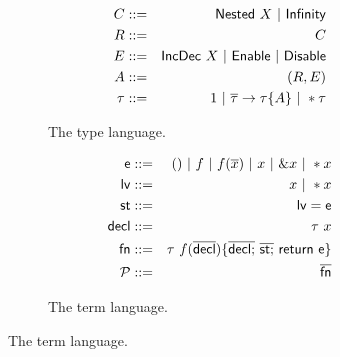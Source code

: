 \documentclass{article}
\begin{document}
\begin{figure}[h]
	\begin{subfigure}[b]{0.5\textwidth}
	\begin{eqnarray*}
		C & ::= & {\sf Nested}~ X ~|~ {{\sf Infinity}} \\
		R & ::= & C \\
		E & ::= & {\sf IncDec}~ X ~|~ {{\sf Enable}} ~|~ {{\sf Disable}} \\
		A & ::= & (R,E) \\
		\tau & ::= & {1} ~|~ \overline{\tau} \rightarrow \tau \{A\} ~|~ *\tau \\
	\end{eqnarray*}
	\caption{The type language.}
	\end{subfigure}
	\begin{subfigure}[b]{0.5\textwidth}
	\begin{eqnarray*}
		\mathsf{e} & ::= & () ~|~ f ~|~ f(\overline{x}) ~|~ x ~|~ \& x ~|~ *x \\
		\mathsf{lv}   & ::= & x ~|~ *x \\
		\mathsf{st} & ::= & \mathsf{lv} = \mathsf{e} \\
		\mathsf{decl} & ::= & \tau~x \\
		\mathsf{fn}   & ::= & \tau~f(\overline{\mathsf{decl}}) \{ \overline{\mathsf{decl};}~\overline{\mathsf{st};}~\mathsf{return}~\mathsf{e} \} \\
		\mathcal{P} & ::= & \overline{\mathsf{fn}}
	\end{eqnarray*}
	\caption{The term language.}
	\end{subfigure}
\end{figure}
\end{document}
